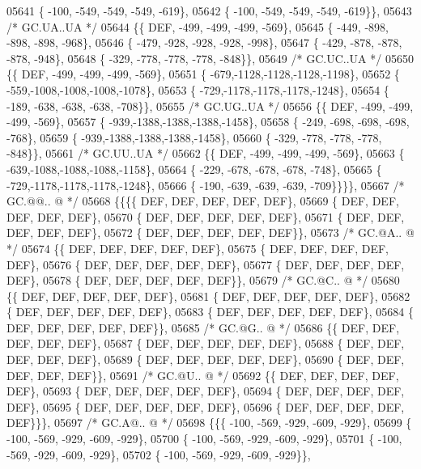 \begin{DoxyCode}
05641 \{ -100, -549, -549, -549, -619\},
05642 \{ -100, -549, -549, -549, -619\}\},
05643 \textcolor{comment}{/* GC.UA..UA */}
05644 \{\{  DEF, -499, -499, -499, -569\},
05645 \{ -449, -898, -898, -898, -968\},
05646 \{ -479, -928, -928, -928, -998\},
05647 \{ -429, -878, -878, -878, -948\},
05648 \{ -329, -778, -778, -778, -848\}\},
05649 \textcolor{comment}{/* GC.UC..UA */}
05650 \{\{  DEF, -499, -499, -499, -569\},
05651 \{ -679,-1128,-1128,-1128,-1198\},
05652 \{ -559,-1008,-1008,-1008,-1078\},
05653 \{ -729,-1178,-1178,-1178,-1248\},
05654 \{ -189, -638, -638, -638, -708\}\},
05655 \textcolor{comment}{/* GC.UG..UA */}
05656 \{\{  DEF, -499, -499, -499, -569\},
05657 \{ -939,-1388,-1388,-1388,-1458\},
05658 \{ -249, -698, -698, -698, -768\},
05659 \{ -939,-1388,-1388,-1388,-1458\},
05660 \{ -329, -778, -778, -778, -848\}\},
05661 \textcolor{comment}{/* GC.UU..UA */}
05662 \{\{  DEF, -499, -499, -499, -569\},
05663 \{ -639,-1088,-1088,-1088,-1158\},
05664 \{ -229, -678, -678, -678, -748\},
05665 \{ -729,-1178,-1178,-1178,-1248\},
05666 \{ -190, -639, -639, -639, -709\}\}\}\},
05667 \textcolor{comment}{/* GC.@@.. @ */}
05668 \{\{\{\{  DEF,  DEF,  DEF,  DEF,  DEF\},
05669 \{  DEF,  DEF,  DEF,  DEF,  DEF\},
05670 \{  DEF,  DEF,  DEF,  DEF,  DEF\},
05671 \{  DEF,  DEF,  DEF,  DEF,  DEF\},
05672 \{  DEF,  DEF,  DEF,  DEF,  DEF\}\},
05673 \textcolor{comment}{/* GC.@A.. @ */}
05674 \{\{  DEF,  DEF,  DEF,  DEF,  DEF\},
05675 \{  DEF,  DEF,  DEF,  DEF,  DEF\},
05676 \{  DEF,  DEF,  DEF,  DEF,  DEF\},
05677 \{  DEF,  DEF,  DEF,  DEF,  DEF\},
05678 \{  DEF,  DEF,  DEF,  DEF,  DEF\}\},
05679 \textcolor{comment}{/* GC.@C.. @ */}
05680 \{\{  DEF,  DEF,  DEF,  DEF,  DEF\},
05681 \{  DEF,  DEF,  DEF,  DEF,  DEF\},
05682 \{  DEF,  DEF,  DEF,  DEF,  DEF\},
05683 \{  DEF,  DEF,  DEF,  DEF,  DEF\},
05684 \{  DEF,  DEF,  DEF,  DEF,  DEF\}\},
05685 \textcolor{comment}{/* GC.@G.. @ */}
05686 \{\{  DEF,  DEF,  DEF,  DEF,  DEF\},
05687 \{  DEF,  DEF,  DEF,  DEF,  DEF\},
05688 \{  DEF,  DEF,  DEF,  DEF,  DEF\},
05689 \{  DEF,  DEF,  DEF,  DEF,  DEF\},
05690 \{  DEF,  DEF,  DEF,  DEF,  DEF\}\},
05691 \textcolor{comment}{/* GC.@U.. @ */}
05692 \{\{  DEF,  DEF,  DEF,  DEF,  DEF\},
05693 \{  DEF,  DEF,  DEF,  DEF,  DEF\},
05694 \{  DEF,  DEF,  DEF,  DEF,  DEF\},
05695 \{  DEF,  DEF,  DEF,  DEF,  DEF\},
05696 \{  DEF,  DEF,  DEF,  DEF,  DEF\}\}\},
05697 \textcolor{comment}{/* GC.A@.. @ */}
05698 \{\{\{ -100, -569, -929, -609, -929\},
05699 \{ -100, -569, -929, -609, -929\},
05700 \{ -100, -569, -929, -609, -929\},
05701 \{ -100, -569, -929, -609, -929\},
05702 \{ -100, -569, -929, -609, -929\}\},

\end{DoxyCode}
